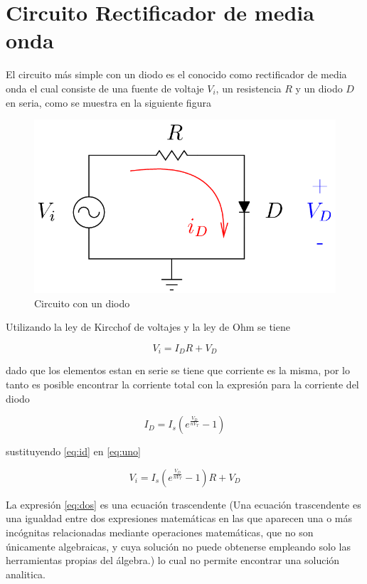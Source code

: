 \documentclass{article}
\begin{document}
    \section{Circuito Rectificador de media
onda}\label{circuito-rectificador-de-media-onda}

El circuito más simple con un diodo es el conocido como rectificador de
media onda el cual consiste de una fuente de voltaje $V_{i}$, un
resistencia $R$ y un diodo $D$ en seria, como se muestra en la siguiente
figura

\begin{figure}[htbp]
\centering
\includegraphics{images/diodosimple.png}
\caption{Circuito con un diodo}
\end{figure}

Utilizando la ley de Kircchof de voltajes y la ley de Ohm se tiene

\begin{equation}\label{eq:uno}
V_{i}=I_{D}R+V_{D}
\end{equation}

dado que los elementos estan en serie se tiene que corriente es la
misma, por lo tanto es posible encontrar la corriente total con la
expresión para la corriente del diodo

\begin{equation}\label{eq:id}
I_{D}=I_{s}\left( e^{\frac{V_{D}}{nV_{T}}}-1\right)
\end{equation}

sustituyendo \eqref{eq:id} en \eqref{eq:uno}

\begin{equation}\label{eq:dos}
V_{i}=I_{s}\left( e^{\frac{V_{D}}{nV_{T}}}-1\right)R+V_{D}
\end{equation}

La expresión \eqref{eq:dos} es una ecuación trascendente (Una ecuación
trascendente es una igualdad entre dos expresiones matemáticas en las
que aparecen una o más incógnitas relacionadas mediante operaciones
matemáticas, que no son únicamente algebraicas, y cuya solución no puede
obtenerse empleando solo las herramientas propias del álgebra.) lo cual
no permite encontrar una solución analitica.
\end{document}
